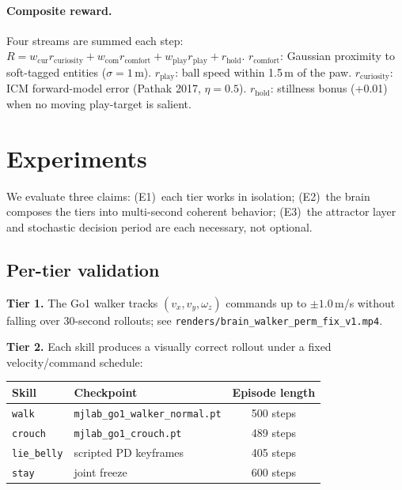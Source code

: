 \documentclass[11pt]{article}
\begin{document}
\paragraph{Composite reward.}
Four streams are summed each step:
$R = w_\text{cur} r_\text{curiosity} + w_\text{com} r_\text{comfort}
    + w_\text{play} r_\text{play} + r_\text{hold}$.
$r_\text{comfort}$: Gaussian proximity to soft-tagged entities ($\sigma\!=\!1$\,m).
$r_\text{play}$: ball speed within 1.5\,m of the paw.
$r_\text{curiosity}$: ICM forward-model error (Pathak 2017, $\eta\!=\!0.5$).
$r_\text{hold}$: stillness bonus (+0.01) when no moving play-target is salient.

\section{Experiments}
\label{sec:experiments}

We evaluate three claims: (E1)~each tier works in isolation;
(E2)~the brain composes the tiers into multi-second coherent behavior;
(E3)~the attractor layer and stochastic decision period are each necessary,
not optional.

\subsection{Per-tier validation}

\textbf{Tier 1.} The Go1 walker tracks $(v_x, v_y, \omega_z)$ commands up to
$\pm 1.0$\,m/s without falling over 30-second rollouts; see
\texttt{renders/brain\_walker\_perm\_fix\_v1.mp4}.

\textbf{Tier 2.} Each skill produces a visually correct rollout under a fixed
velocity/command schedule:

\begin{center}\small
\begin{tabular}{llc}
\toprule
Skill & Checkpoint & Episode length \\
\midrule
\texttt{walk}       & \texttt{mjlab\_go1\_walker\_normal.pt} & 500 steps \\
\texttt{crouch}     & \texttt{mjlab\_go1\_crouch.pt}        & 489 steps \\
\texttt{lie\_belly} & scripted PD keyframes                 & 405 steps \\
\texttt{stay}       & joint freeze                          & 600 steps \\
\bottomrule
\end{tabular}
\end{center}
\end{document}
